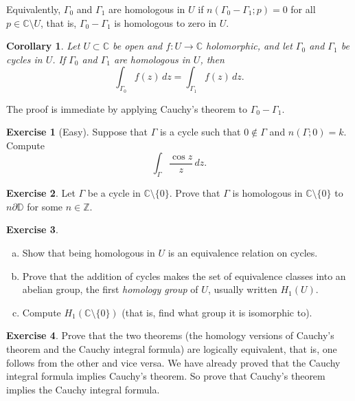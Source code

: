 \documentclass[12pt,openany]{book}
\newcommand{\C}{{\mathbb{C}}}
\newcommand{\Z}{{\mathbb{Z}}}
\newcommand{\D}{{\mathbb{D}}}
\newcommand{\myindex}[1]{#1\index{#1}}
\theoremstyle{plain}
\newtheorem{cor}[thm]{Corollary}
\theoremstyle{remark}
\theoremstyle{definition}
\newenvironment{exbox}{%
    \def\FrameCommand{\vrule width 1pt \relax\hspace{10pt}}%
    \MakeFramed{\advance\hsize-\width\FrameRestore}%
}{%
    \endMakeFramed
}
\newenvironment{exparts}{%
    \leavevmode\begin{enumerate}[a),noitemsep,topsep=0pt,parsep=0pt,partopsep=0pt]
}{%
    \end{enumerate}
}
\theoremstyle{exercise}
\newtheorem{exercise}{Exercise}[section]
\theoremstyle{example}
\begin{document}
Equivalently, $\Gamma_0$ and $\Gamma_1$ are homologous in $U$ if
$n(\Gamma_0 - \Gamma_1;p) = 0$ for all $p \in \C \setminus U$,
that is, $\Gamma_0-\Gamma_1$ is homologous to zero in $U$.

\begin{cor} \label{cor:homologoussameint}
Let $U \subset \C$ be open and $f \colon U \to \C$ holomorphic,
and let
$\Gamma_0$ and $\Gamma_1$ be cycles in $U$.
If 
$\Gamma_0$ and $\Gamma_1$ are
homologous in $U$, then
\begin{equation*}
\int_{\Gamma_0} f(z)\, dz = 
\int_{\Gamma_1} f(z)\, dz .
\end{equation*}
\end{cor}

The proof is immediate by applying Cauchy's theorem to $\Gamma_0-\Gamma_1$.

\begin{exbox}
\begin{exercise}[Easy]
Suppose that $\Gamma$ is a cycle such that
$0 \notin \Gamma$ and
$n(\Gamma;0) = k$.  Compute
\begin{equation*}
\int_{\Gamma} \frac{\cos z}{z} \, dz .
\end{equation*}
\end{exercise}

\begin{exercise}
Let $\Gamma$ be
a cycle in $\C \setminus \{ 0 \}$.
Prove that $\Gamma$ is homologous in $\C \setminus \{ 0 \}$
to $n \partial \D$ for some $n \in \Z$.
\end{exercise}

\begin{exercise} \label{exercise:H1U}
\begin{exparts}
\item
Show that being homologous in $U$ is an equivalence relation on cycles.
\item
Prove that the addition of cycles makes the set of equivalence classes
into an abelian group, the
first \emph{\myindex{homology group}} of $U$,
usually written $H_1(U)$.
\item
Compute $H_1(\C \setminus \{ 0 \})$ (that is,
find what group it is isomorphic to).
\end{exparts}
\end{exercise}

\begin{exercise}
Prove that the two theorems
(the homology versions of Cauchy's theorem and the Cauchy integral formula)
are logically equivalent, that is, one follows
from the other and vice versa.  We have already proved that the Cauchy integral formula
implies Cauchy's theorem.  So prove that
Cauchy's theorem implies the Cauchy integral formula.
\end{exercise}


\end{exbox}
\end{document}
